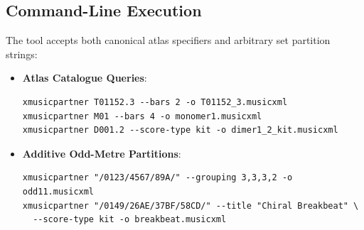 \subsection{Command-Line Execution}

The tool accepts both canonical atlas specifiers and arbitrary set partition strings:
\begin{itemize}
    \item \textbf{Atlas Catalogue Queries}:
{\small
\begin{verbatim}
xmusicpartner T01152.3 --bars 2 -o T01152_3.musicxml
xmusicpartner M01 --bars 4 -o monomer1.musicxml
xmusicpartner D001.2 --score-type kit -o dimer1_2_kit.musicxml
\end{verbatim}}

    \item \textbf{Additive Odd-Metre Partitions}:
{\small
\begin{verbatim}
xmusicpartner "/0123/4567/89A/" --grouping 3,3,3,2 -o odd11.musicxml
xmusicpartner "/0149/26AE/37BF/58CD/" --title "Chiral Breakbeat" \
  --score-type kit -o breakbeat.musicxml
\end{verbatim}}
\end{itemize}
